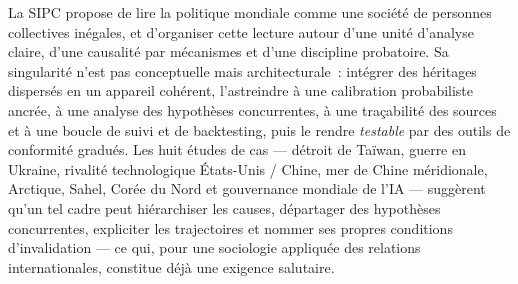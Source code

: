 \documentclass[11pt,a4paper]{article}
\begin{document}
La SIPC propose de lire la politique mondiale comme une société de personnes collectives
inégales, et d'organiser cette lecture autour d'une unité d'analyse claire, d'une causalité par
mécanismes et d'une discipline probatoire. Sa singularité n'est pas conceptuelle mais
architecturale~: intégrer des héritages dispersés en un appareil cohérent, l'astreindre à une
calibration probabiliste ancrée, à une analyse des hypothèses concurrentes, à une traçabilité
des sources et à une boucle de suivi et de backtesting, puis le rendre \emph{testable} par des
outils de conformité gradués. Les huit études de cas --- détroit de Taïwan, guerre en Ukraine,
rivalité technologique États-Unis / Chine, mer de Chine méridionale, Arctique, Sahel, Corée du
Nord et gouvernance mondiale de l'IA --- suggèrent
qu'un tel cadre peut hiérarchiser les causes, départager des hypothèses concurrentes, expliciter
les trajectoires et nommer ses propres conditions d'invalidation --- ce qui, pour une sociologie
appliquée des relations internationales, constitue déjà une exigence salutaire.

\printbibliography[heading=bibintoc,title={Bibliographie}]
\end{document}
